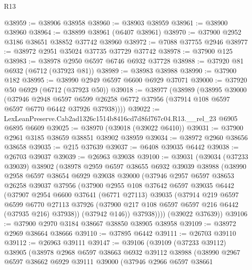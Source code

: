 \begin{lexlean}{R13}
\begin{coremodule}
@38959 := @38906 @38958
@38960 := @38903 @38959
@38961 := @38900 @38960
@38964 := @38899 @38961 (@6407 @38961)
@38970 := @37900 @2952 @3186 @38651 @38852 @37742 @38960
@38972 := @7088 @37755 @2946
@38977 := @38972 @2951 @35024 @37735 @37729 @37742
@38978 := @37900 @125
@38983 := @38978 @2950 @6597 @6746 @6932 @37728
@38988 := @37920 @81 @6932 (@6712 (@37923 @81))
@38989 := @38983 @38988
@38990 := @37900 @182
@38995 := @38990 @2949 @6597 @6600 @6929 @37071
@39000 := @37920 @50 @6929 (@6712 (@37923 @50))
@39018 := @38977
    (@38989
      (@38995
        @39000
        (@37946
          @2948
          @6597
          @6599
          @26258
          @6772
          @37956
          (@37914 @108 @6597 @6597 @6770 @6442 @37926 @37938))))
@39022 := LexLeanPreserve.Cab2ad1326c1514b8416cd7d8fd767c04.R13.__rel_23 @6905 @6895 @6609
@39025 := @38970 (@39018 (@39022 @6410))
@39031 := @37900 @2961 @3185 @38659 @38851 @38902 @38959
@39034 := @38972 @2960 @38656 @38658
@39035 := @215 @37639
@39037 := @6408 @39035 @6442
@39038 := @26703 @39037
@39039 := @26963 @39038
@39100 := @39031
    (@39034
      (@37233 @39039)
      @38902
      (@38978
        @2959
        @6597
        @38655
        @6932
        @39039
        @38988
        (@38990
          @2958
          @6597
          @38654
          @6929
          @39038
          @39000
          (@37946
            @2957
            @6597
            @38653
            @26258
            @39037
            @37956
            (@37900
              @2955
              @108
              @37642
              @6597
              @39035
              @6442
              (@37907
                @2954
                @6600
                @37641
                (@6771 @27113)
                @39035
                (@37914
                  @219
                  @6597
                  @6599
                  @6770
                  @27113
                  @37926
                  (@37900 @217 @108 @6597 @6597 @216 @6442 (@37935 @216) @37938))
                (@37942 @146))
              @37938))))
      (@39022 @37639))
@39106 := @37900 @2970 @3184 @38667 @38850 @38905 @38958
@39109 := @38972 @2969 @38664 @38666
@39110 := @37895 @6442
@39111 := @26703 @39110
@39112 := @26963 @39111
@39147 := @39106
    (@39109
      (@37233 @39112)
      @38905
      (@38978
        @2968
        @6597
        @38663
        @6932
        @39112
        @38988
        (@38990
          @2967
          @6597
          @38662
          @6929
          @39111
          @39000
          (@37946
            @2966
            @6597
            @38661

\end{coremodule}
\end{lexlean}
